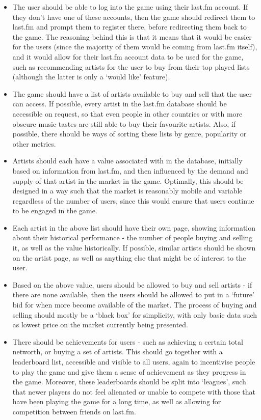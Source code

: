 \documentclass[a4paper,10pt,twoside]{article}
\begin{document}
\begin{itemize}
\item The user should be able to log into the game using their last.fm account. If they don't have one of these accounts, then the game should redirect them to last.fm and prompt them to register there, before redirecting them back to the game. The reasoning behind this is that it means that it would be easier for the users (since the majority of them would be coming from last.fm itself), and it would allow for their last.fm account data to be used for the game, such as recommending artists for the user to buy from their top played lists (although the latter is only a `would like' feature).
\item The game should have a list of artists available to buy and sell that the user can access. If possible, every artist in the last.fm database should be accessible on request, so that even people in other countries or with more obscure music tastes are still able to buy their favourite artists. Also, if possible, there should be ways of sorting these lists by genre, popularity or other metrics.
\item Artists should each have a value associated with in the database, initially based on information from last.fm, and then influenced by the demand and supply of that artist in the market in the game. Optimally, this should be designed in a way such that the market is reasonably mobile and variable regardless of the number of users, since this would ensure that users continue to be engaged in the game.
\item Each artist in the above list should have their own page, showing information about their historical performance - the number of people buying and selling it, as well as the value historically. If possible, similar artists should be shown on the artist page, as well as anything else that might be of interest to the user.
\item Based on the above value, users should be allowed to buy and sell artists - if there are none available, then the users should be allowed to put in a `future' bid for when more become available of the market. The process of buying and selling should mostly be a `black box' for simplicity, with only basic data such as lowest price on the market currently being presented.
\item There should be achievements for users - such as achieving a certain total networth, or buying a set of artists. This should go together with a leaderboard list, accessible and visible to all users, again to incentivise people to play the game and give them a sense of achievement as they progress in the game. Moreover, these leaderboards should be split into `leagues', such that newer players do not feel alienated or unable to compete with those that have been playing the game for a long time, as well as allowing for competition between friends on last.fm.

\end{itemize}
\end{document}
